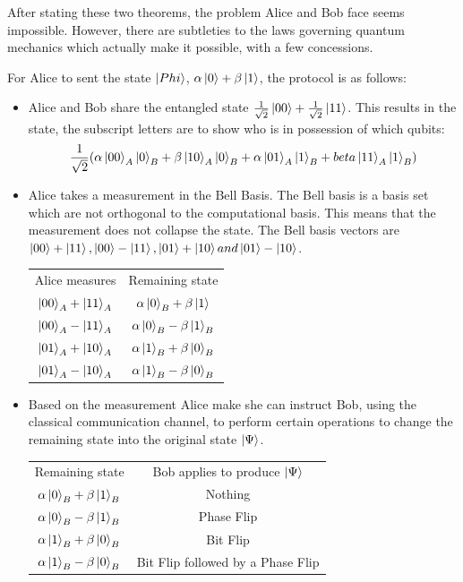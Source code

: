 \documentclass[authoryearcitations]{UoYCSproject}
\begin{document}
After stating these two theorems, the problem Alice and Bob face seems impossible.
However, there are subtleties to the laws governing quantum mechanics which actually make it possible, with a few concessions.

For Alice to sent the state $\left\vert{Phi}\right\rangle$, $\alpha\left\vert{0}\right\rangle+\beta\left\vert{1}\right\rangle$, the protocol is as follows:
\begin{itemize}
 \item Alice and Bob share the entangled state $\frac{1}{\sqrt{2}}\left\vert{00}\right\rangle+\frac{1}{\sqrt{2}}\left\vert{11}\right\rangle$.
This results in the state, the subscript letters are to show who is in possession of which qubits:
\begin{equation}
 \frac{1}{\sqrt{2}}(\alpha\left\vert{00}\right\rangle_A\left\vert{0}\right\rangle_B+\beta\left\vert{10}\right\rangle_A\left\vert{0}\right\rangle_B+\alpha\left\vert{01}\right\rangle_A\left\vert{1}\right\rangle_B+beta\left\vert{11}\right\rangle_A\left\vert{1}\right\rangle_B)
\end{equation}
\item Alice takes a measurement in the Bell Basis.
The Bell basis is a basis set which are not orthogonal to the computational basis.
This means that the measurement does not collapse the state.
The Bell basis vectors are $\left\vert{00}\right\rangle+\left\vert{11}\right\rangle, \left\vert{00}\right\rangle-\left\vert{11}\right\rangle, \left\vert{01}\right\rangle+\left\vert{10}\right\rangle and \left\vert{01}\right\rangle-\left\vert{10}\right\rangle$.
\begin{center}
\begin{tabular}{cc}
Alice measures & Remaining state\\
$\left\vert{00}\right\rangle_A+\left\vert{11}\right\rangle_A$ & $\alpha\left\vert{0}\right\rangle_B+\beta\left\vert{1}\right\rangle$\\
$\left\vert{00}\right\rangle_A-\left\vert{11}\right\rangle_A$ & $\alpha\left\vert{0}\right\rangle_B-\beta\left\vert{1}\right\rangle_B$\\
$\left\vert{01}\right\rangle_A+\left\vert{10}\right\rangle_A$ & $\alpha\left\vert{1}\right\rangle_B+\beta\left\vert{0}\right\rangle_B$\\
$\left\vert{01}\right\rangle_A-\left\vert{10}\right\rangle_A$ & $\alpha\left\vert{1}\right\rangle_B-\beta\left\vert{0}\right\rangle_B$
\end{tabular}
\end{center}

\item Based on the measurement Alice make she can instruct Bob, using the classical communication channel, to perform certain operations to change the remaining state into the original state $\left\vert{\Psi}\right\rangle$.
\begin{center}
\begin{tabular}{cc}
Remaining state & Bob applies to produce $\left\vert{\Psi}\right\rangle$\\
$\alpha\left\vert{0}\right\rangle_B+\beta\left\vert{1}\right\rangle_B$ & Nothing\\
$\alpha\left\vert{0}\right\rangle_B-\beta\left\vert{1}\right\rangle_B$ & Phase Flip\\
$\alpha\left\vert{1}\right\rangle_B+\beta\left\vert{0}\right\rangle_B$ & Bit Flip\\
$\alpha\left\vert{1}\right\rangle_B-\beta\left\vert{0}\right\rangle_B$ & Bit Flip followed by a Phase Flip
\end{tabular}
\end{center}
\end{itemize}
\end{document}
